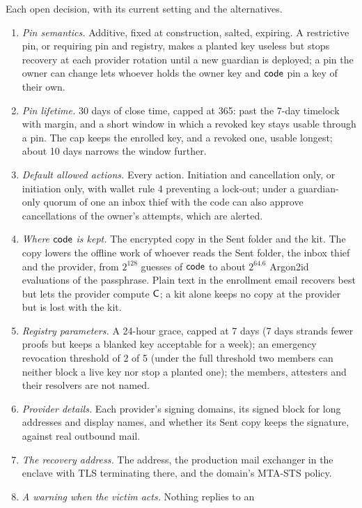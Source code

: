Each open decision, with its current setting and the alternatives.
\begin{enumerate}
  \item \emph{Pin semantics.} Additive, fixed at construction, salted,
    expiring. A restrictive pin, or requiring pin and registry, makes a
    planted key useless but stops recovery at each provider rotation until a
    new guardian is deployed; a pin the owner can change lets whoever holds
    the owner key and $\mathsf{code}$ pin a key of their own.
  \item \emph{Pin lifetime.} 30 days of close time, capped at 365: past the
    7-day timelock with margin, and a short window in which a revoked key
    stays usable through a pin. The cap keeps the enrolled key, and a revoked
    one, usable longest; about 10 days narrows the window further.
  \item \emph{Default allowed actions.} Every action. Initiation and
    cancellation only, or initiation only, with wallet rule 4 preventing a
    lock-out; under a guardian-only quorum of one an inbox thief with the
    code can also approve cancellations of the owner's attempts, which are
    alerted.
  \item \emph{Where $\mathsf{code}$ is kept.} The encrypted copy in the Sent folder
    and the kit. The copy lowers the offline work of whoever reads the Sent
    folder, the inbox thief and the provider, from $2^{128}$ guesses of
    $\mathsf{code}$ to about $2^{64.6}$ Argon2id evaluations of the passphrase. Plain text in the enrollment email recovers best but lets
    the provider compute $\mathsf{C}$; a kit alone keeps no copy at the provider but
    is lost with the kit.
  \item \emph{Registry parameters.} A 24-hour grace, capped at 7 days (7
    days strands fewer proofs but keeps a blanked key acceptable for a week);
    an emergency revocation threshold of 2 of 5 (under the full threshold two
    members can neither block a live key nor stop a planted one); the
    members, attesters and their resolvers are not named.
  \item \emph{Provider details.} Each provider's signing domains, its signed
    block for long addresses and display names, and whether its Sent copy
    keeps the signature, against real outbound mail.
  \item \emph{The recovery address.} The address, the production mail
    exchanger in the enclave with TLS terminating there, and the domain's
    MTA-STS policy.
  \item \emph{A warning when the victim acts.} Nothing replies to an

\end{enumerate}
